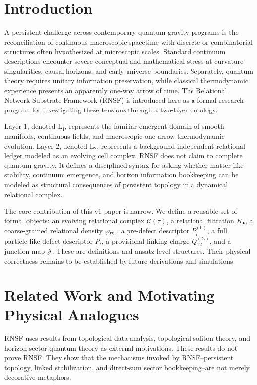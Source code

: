 \documentclass[11pt]{article}
\newcommand{\Ccal}{\mathcal{C}}
\newcommand{\Jmap}{\mathcal{J}}
\newcommand{\Pre}{P_i^{(0)}}
\newcommand{\Pfull}{P_i}
\newcommand{\Qlink}{Q_{12}^{(\Sigma)}}
\begin{document}
\section{Introduction}

A persistent challenge across contemporary quantum-gravity programs is the reconciliation of continuous macroscopic spacetime with discrete or combinatorial structures often hypothesized at microscopic scales. Standard continuum descriptions encounter severe conceptual and mathematical stress at curvature singularities, causal horizons, and early-universe boundaries. Separately, quantum theory requires unitary information preservation, while classical thermodynamic experience presents an apparently one-way arrow of time. The Relational Network Substrate Framework (RNSF) is introduced here as a formal research program for investigating these tensions through a two-layer ontology.

Layer 1, denoted \(\mathrm{L}_1\), represents the familiar emergent domain of smooth manifolds, continuous fields, and macroscopic one-arrow thermodynamic evolution. Layer 2, denoted \(\mathrm{L}_2\), represents a background-independent relational ledger modeled as an evolving cell complex. RNSF does not claim to complete quantum gravity. It defines a disciplined syntax for asking whether matter-like stability, continuum emergence, and horizon information bookkeeping can be modeled as structural consequences of persistent topology in a dynamical relational complex.

The core contribution of this v1 paper is narrow. We define a reusable set of formal objects: an evolving relational complex \(\Ccal(\tau)\), a relational filtration \(K_\bullet\), a coarse-grained relational density \(\varphi_{\rm rel}\), a pre-defect descriptor \(\Pre\), a full particle-like defect descriptor \(\Pfull\), a provisional linking charge \(\Qlink\), and a junction map \(\Jmap\). These are definitions and ansatz-level structures. Their physical correctness remains to be established by future derivations and simulations.

\section{Related Work and Motivating Physical Analogues}

RNSF uses results from topological data analysis, topological soliton theory, and horizon-sector quantum theory as external motivations. These results do not prove RNSF. They show that the mechanisms invoked by RNSF--persistent topology, linked stabilization, and direct-sum sector bookkeeping--are not merely decorative metaphors.
\end{document}
